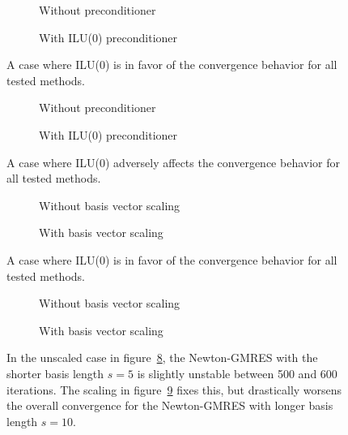 \documentclass{scrartcl}
\numberwithin{equation}{section}
\begin{document}
\begin{figure}
\centering
\begin{subfigure}{.5\textwidth}
  \centering
  \resizebox{.9\textwidth}{!}{}
  \caption{Without preconditioner}
  \label{fig:sherman3_unscaled}
\end{subfigure}%
\begin{subfigure}{.5\textwidth}
  \centering
  \resizebox{.9\textwidth}{!}{}
  \caption{With ILU(0) preconditioner}
  \label{fig:sherman3_ilu0}
\end{subfigure}
\caption{A case where ILU(0) is in favor of the convergence behavior for all tested methods.}
\label{fig:sherman3}
\begin{subfigure}{.5\textwidth}
  \centering
  \resizebox{.9\textwidth}{!}{}
  \caption{Without preconditioner}
  \label{fig:xenon2}
\end{subfigure}%
\begin{subfigure}{.5\textwidth}
  \centering
  \resizebox{.9\textwidth}{!}{}
  \caption{With ILU(0) preconditioner}
  \label{fig:xenon2_ilu0}
\end{subfigure}
\caption{A case where ILU(0) adversely affects the convergence behavior for all tested methods.}
\label{fig:xenon}
\end{figure}

\begin{figure}
\centering
\begin{subfigure}{.5\textwidth}
	\centering
	\resizebox{.9\textwidth}{!}{}
	\caption{Without basis vector scaling}
	\label{fig:bcsstk18_noscale}
\end{subfigure}%
\begin{subfigure}{.5\textwidth}
	\centering
	\resizebox{.9\textwidth}{!}{}
	\caption{With basis vector scaling}
	\label{fig:bcsstk18_scale}
\end{subfigure}
\caption{A case where ILU(0) is in favor of the convergence behavior for all tested methods.}
\label{fig:bcsstk18}
\begin{subfigure}{.5\textwidth}
	\centering
	\resizebox{.9\textwidth}{!}{}
	\caption{Without basis vector scaling}
	\label{fig:pwtk_noscale}
\end{subfigure}%
\begin{subfigure}{.5\textwidth}
	\centering
	\resizebox{.9\textwidth}{!}{}
	\caption{With basis vector scaling}
	\label{fig:pwtk_scale}
\end{subfigure}
\caption{In the unscaled case in figure~\ref{fig:pwtk_noscale}, the Newton-GMRES with the shorter basis length $s = 5$ is slightly unstable between 500 and 600 iterations. The scaling in figure~\ref{fig:pwtk_scale} fixes this, but drastically worsens the overall convergence for the Newton-GMRES with longer basis length $s = 10$.}
\label{fig:pwtk}
\end{figure}
\end{document}
